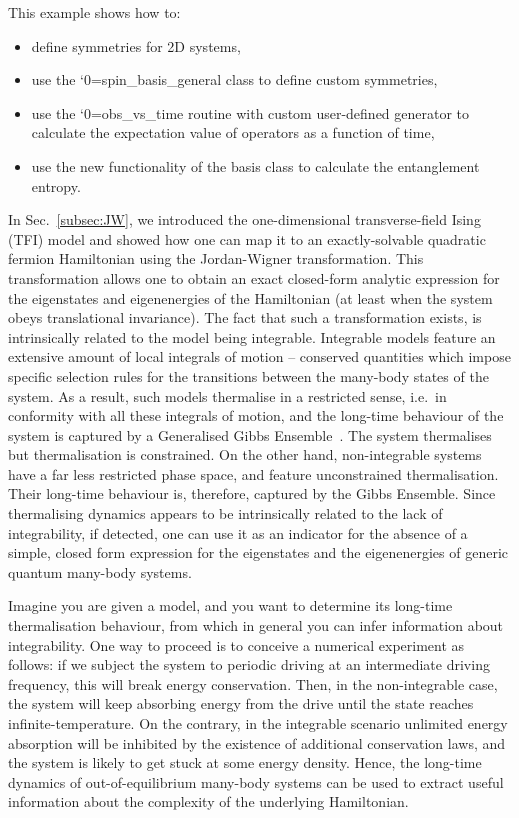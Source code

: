 \documentclass{SciPost}
\newcommand\0{\scalebox{-1}[1]{0}}
\let\svttfamily\ttfamily
\renewcommand\ttfamily{\svttfamily\catcode`0=\active }
\renewcommand\texttt{\bgroup\ttfamily\texttthelp}
\def\texttthelp#1{#1\egroup}
\begin{document}
This example shows how to:
\begin{itemize}
	\item define symmetries for 2D systems,
	\item use the \texttt{spin\_basis\_general} class to define custom symmetries,
	\item use the \texttt{obs\_vs\_time} routine with custom user-defined generator to calculate the expectation value of operators as a function of time,
	\item use the new functionality of the basis class to calculate the entanglement entropy.
\end{itemize}

 In Sec.~\ref{subsec:JW}, we introduced the one-dimensional transverse-field Ising (TFI) model and showed how one can map it to an exactly-solvable quadratic fermion Hamiltonian using the Jordan-Wigner transformation. This transformation allows one to obtain an exact closed-form analytic expression for the eigenstates and eigenenergies of the Hamiltonian (at least when the system obeys translational invariance). The fact that such a transformation exists, is intrinsically related to the model being integrable. Integrable models feature an extensive amount of local integrals of motion -- conserved quantities which impose specific selection rules for the transitions between the many-body states of the system. As a result, such models thermalise in a restricted sense, i.e.~in conformity with all these integrals of motion, and the long-time behaviour of the system is captured by a Generalised Gibbs Ensemble~\cite{TD_review}. The system thermalises but thermalisation is constrained. On the other hand, non-integrable systems have a far less restricted phase space, and feature unconstrained thermalisation. Their long-time behaviour is, therefore, captured by the Gibbs Ensemble. Since thermalising dynamics appears to be intrinsically related to the lack of integrability, if detected, one can use it as an indicator for the absence of a simple, closed form expression for the eigenstates and the eigenenergies of generic quantum many-body systems.

Imagine you are given a model, and you want to determine its long-time thermalisation behaviour, from which in general you can infer information about integrability. One way to proceed is to conceive a numerical experiment as follows: if we subject the system to periodic driving at an intermediate driving frequency, this will break energy conservation. Then, in the non-integrable case, the system will keep absorbing energy from the drive until the state reaches infinite-temperature. On the contrary, in the integrable scenario unlimited energy absorption will be inhibited by the existence of additional conservation laws, and the system is likely to get stuck at some energy density. Hence, the long-time dynamics of out-of-equilibrium many-body systems can be used to extract useful information about the complexity of the underlying Hamiltonian.
\end{document}
